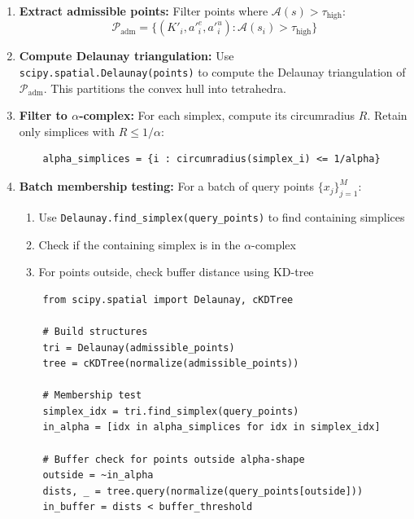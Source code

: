 \begin{enumerate}
    \item \textbf{Extract admissible points:} Filter points where $\mathcal{A}(s) > \tau_{\text{high}}$:
    \begin{equation}
        \mathcal{P}_{\text{adm}} = \{(K'_i, a'^e_i, a'^u_i) : \mathcal{A}(s_i) > \tau_{\text{high}}\}
    \end{equation}
    
    \item \textbf{Compute Delaunay triangulation:} Use \texttt{scipy.spatial.Delaunay(points)} to compute the Delaunay triangulation of $\mathcal{P}_{\text{adm}}$. This partitions the convex hull into tetrahedra.
    
    \item \textbf{Filter to $\alpha$-complex:} For each simplex, compute its circumradius $R$. Retain only simplices with $R \leq 1/\alpha$:
    \begin{verbatim}
    alpha_simplices = {i : circumradius(simplex_i) <= 1/alpha}
    \end{verbatim}
    
    \item \textbf{Batch membership testing:} For a batch of query points $\{x_j\}_{j=1}^M$:
    \begin{enumerate}
        \item Use \texttt{Delaunay.find\_simplex(query\_points)} to find containing simplices
        \item Check if the containing simplex is in the $\alpha$-complex
        \item For points outside, check buffer distance using KD-tree
    \end{enumerate}
    \begin{verbatim}
    from scipy.spatial import Delaunay, cKDTree
    
    # Build structures
    tri = Delaunay(admissible_points)
    tree = cKDTree(normalize(admissible_points))
    
    # Membership test
    simplex_idx = tri.find_simplex(query_points)
    in_alpha = [idx in alpha_simplices for idx in simplex_idx]
    
    # Buffer check for points outside alpha-shape
    outside = ~in_alpha
    dists, _ = tree.query(normalize(query_points[outside]))
    in_buffer = dists < buffer_threshold
    \end{verbatim}
\end{enumerate}


